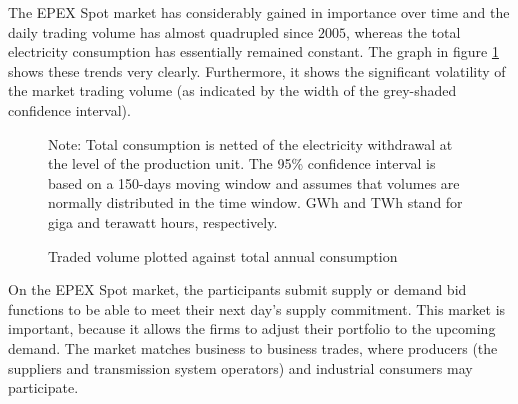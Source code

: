 The EPEX Spot market has considerably gained in importance over time and the daily trading volume has almost quadrupled since $2005$, whereas the total electricity consumption has essentially remained constant. The graph in figure \ref{volconsfr} shows these trends very clearly. Furthermore, it shows the significant volatility of the market trading volume (as indicated by the width 
of the grey-shaded confidence interval).  \\
\begin{figure}[!ht]
\begin{center}  \end{center}
\caption{Traded volume plotted against total annual consumption}
\label{volconsfr}
{\small Note: Total consumption is netted of the electricity withdrawal at the level of the production unit. The 95\% confidence interval is based on a 150-days moving window and assumes that volumes are normally distributed in the time window. GWh and TWh stand for giga and terawatt hours, respectively.}
\end{figure}


On the EPEX Spot market, the participants submit supply or demand bid functions to be able to meet their next day's supply commitment. 
This market is important, because it allows the firms to adjust their  portfolio to the upcoming demand. The market matches business to business trades, where producers (the suppliers and transmission system operators) and industrial consumers may participate.\\


